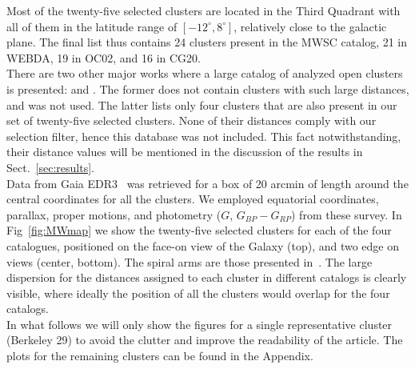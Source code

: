 \documentclass[referee]{aa}
\begin{document}
 Most of the twenty-five selected clusters are located in the Third Quadrant
 with all of them in the latitude range of $\left[-12^{\circ}, 8^{\circ}\right]$,
 relatively close to the galactic plane. The final list thus contains 24
 clusters present in the MWSC catalog, 21 in WEBDA, 19 in OC02, and 16 in
 CG20.\\

 There are two other major works where a large catalog of analyzed open clusters
 is presented: \cite{Lui_2019} and \cite{Dias_2021}. The former does not contain
 clusters with such large distances, and was not used. The latter lists
 only four clusters that are also present in our set of twenty-five selected
 clusters. None of their distances comply with our selection filter, hence this
 database was not included. This fact notwithstanding, their distance values will
 be mentioned in the discussion of the results in Sect.~\ref{sec:results}.\\

 Data from Gaia EDR3~\citep{Gaia_2016,Gaia_EDR3} was retrieved for a box of 20
 arcmin of length around the central coordinates for all the clusters. We
 employed equatorial coordinates, parallax, proper motions, and photometry
 ($G$, $G_{BP}-G_{RP}$) from these survey.
 In Fig~\ref{fig:MWmap} we show the twenty-five selected clusters for each of
 the four catalogues, positioned on the face-on view of the Galaxy (top), and
 two edge on views (center, bottom). The spiral arms are those presented
 in~\cite{Momany_2006}. The large dispersion for the distances
 assigned to each cluster in different catalogs is clearly visible, where
 ideally the position of all the clusters would overlap for the four catalogs.\\

 In what follows we will only show the figures for a single representative
 cluster (Berkeley 29) to avoid the clutter and improve the readability of the
 article. The plots for the remaining clusters can be found in the Appendix.
\end{document}
